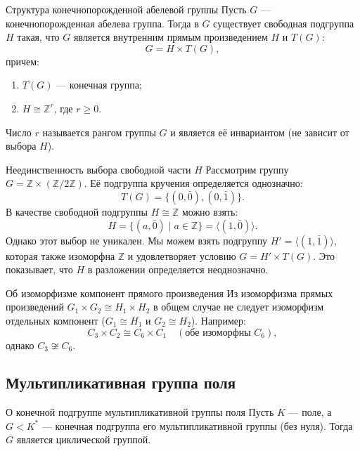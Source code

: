 \begin{Theorem}{Структура конечнопорожденной абелевой группы}{}
	Пусть $G$ --- конечнопорожденная абелева группа. Тогда в $G$ существует свободная подгруппа $H$ такая, что $G$ является внутренним прямым произведением $H$ и $T(G)$:
	\[
	G = H \times T(G),
	\]
	причем:
	\begin{enumerate}
		\item $T(G)$ --- конечная группа;
		\item $H \cong \mathbb{Z}^r$, где $r \ge 0$.
	\end{enumerate}
	Число $r$ называется рангом группы $G$ и является её инвариантом (не зависит от выбора $H$).
\end{Theorem}

\begin{Example}{Неединственность выбора свободной части $H$}{}
	Рассмотрим группу $G = \mathbb{Z} \times (\mathbb{Z}/2\mathbb{Z})$.
	Её подгруппа кручения определяется однозначно:
	\[
	T(G) = \{ (0, \bar{0}), (0, \bar{1}) \}.
	\]
	В качестве свободной подгруппы $H \cong \mathbb{Z}$ можно взять:
	\[
	H = \{ (a, \bar{0}) \mid a \in \mathbb{Z} \} = \langle (1, \bar{0}) \rangle.
	\]
	Однако этот выбор не уникален. Мы можем взять подгруппу $H' = \langle (1, \bar{1}) \rangle$, которая также изоморфна $\mathbb{Z}$ и удовлетворяет условию $G = H' \times T(G)$. Это показывает, что $H$ в разложении определяется неоднозначно.
\end{Example}

\begin{Example}{Об изоморфизме компонент прямого произведения}{}
	Из изоморфизма прямых произведений $G_1 \times G_2 \cong H_1 \times H_2$ в общем случае не следует изоморфизм отдельных компонент ($G_1 \cong H_1$ и $G_2 \cong H_2$).
	Например:
	\[
	C_3 \times C_2 \cong C_6 \times C_1 \quad (\text{обе изоморфны } C_6),
	\]
	однако $C_3 \not\cong C_6$.
	
\end{Example}

\subsection{Мультипликативная группа поля}

\begin{Theorem}{О конечной подгруппе мультипликативной группы поля}{}
	Пусть $K$ --- поле, а $G < K^*$ --- конечная подгруппа его мультипликативной группы (без нуля). Тогда $G$ является циклической группой.
\end{Theorem}

